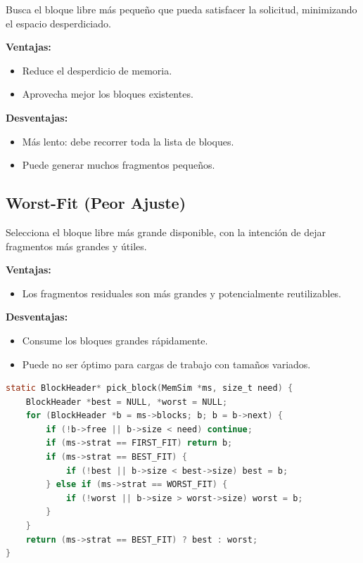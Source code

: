 \documentclass[12pt,a4paper]{article}
\begin{document}
Busca el bloque libre más pequeño que pueda satisfacer la solicitud, minimizando el espacio desperdiciado.

\textbf{Ventajas:}
\begin{itemize}
    \item Reduce el desperdicio de memoria.
    \item Aprovecha mejor los bloques existentes.
\end{itemize}

\textbf{Desventajas:}
\begin{itemize}
    \item Más lento: debe recorrer toda la lista de bloques.
    \item Puede generar muchos fragmentos pequeños.
\end{itemize}

\subsection{Worst-Fit (Peor Ajuste)}

Selecciona el bloque libre más grande disponible, con la intención de dejar fragmentos más grandes y útiles.

\textbf{Ventajas:}
\begin{itemize}
    \item Los fragmentos residuales son más grandes y potencialmente reutilizables.
\end{itemize}

\textbf{Desventajas:}
\begin{itemize}
    \item Consume los bloques grandes rápidamente.
    \item Puede no ser óptimo para cargas de trabajo con tamaños variados.
\end{itemize}

\begin{lstlisting}[language=C]
static BlockHeader* pick_block(MemSim *ms, size_t need) {
    BlockHeader *best = NULL, *worst = NULL;
    for (BlockHeader *b = ms->blocks; b; b = b->next) {
        if (!b->free || b->size < need) continue;
        if (ms->strat == FIRST_FIT) return b;
        if (ms->strat == BEST_FIT) {
            if (!best || b->size < best->size) best = b;
        } else if (ms->strat == WORST_FIT) {
            if (!worst || b->size > worst->size) worst = b;
        }
    }
    return (ms->strat == BEST_FIT) ? best : worst;
}
\end{lstlisting}
\end{document}
